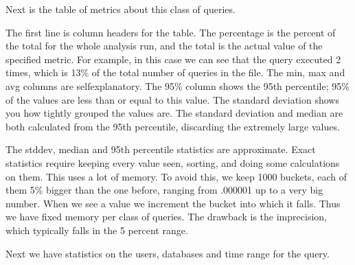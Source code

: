 \documentclass[letterpaper,10pt,english]{sphinxmanual}
\begin{document}
\sphinxAtStartPar
Next is the table of metrics about this class of queries.

\begin{sphinxVerbatim}[commandchars=\\\{\}]
\end{sphinxVerbatim}

\sphinxAtStartPar
The first line is column headers for the table.  The percentage is the percent
of the total for the whole analysis run, and the total is the actual value of
the specified metric.  For example, in this case we can see that the query
executed 2 times, which is 13\% of the total number of queries in the file.  The
min, max and avg columns are self\sphinxhyphen{}explanatory.  The 95\% column shows the 95th
percentile; 95\% of the values are less than or equal to this value.  The
standard deviation shows you how tightly grouped the values are.  The standard
deviation and median are both calculated from the 95th percentile, discarding
the extremely large values.

\sphinxAtStartPar
The stddev, median and 95th percentile statistics are approximate.  Exact
statistics require keeping every value seen, sorting, and doing some
calculations on them.  This uses a lot of memory.  To avoid this, we keep 1000
buckets, each of them 5\% bigger than the one before, ranging from .000001 up to
a very big number.  When we see a value we increment the bucket into which it
falls.  Thus we have fixed memory per class of queries.  The drawback is the
imprecision, which typically falls in the 5 percent range.

\sphinxAtStartPar
Next we have statistics on the users, databases and time range for the query.

\begin{sphinxVerbatim}[commandchars=\\\{\}]
\end{sphinxVerbatim}
\end{document}
